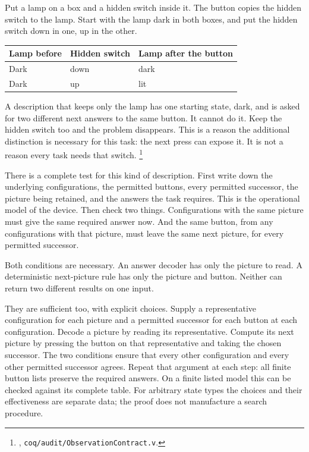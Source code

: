 \documentclass[11pt,twoside]{article}
\theoremstyle{thielethm}
\theoremstyle{thieledef}
\theoremstyle{thieledef}
\theoremstyle{thieledef}
\theoremstyle{thielethm}
\theoremstyle{thieleobs}
\theoremstyle{thielethm}
\begin{document}
Put a lamp on a box and a hidden switch inside it. The button copies the
hidden switch to the lamp. Start with the lamp dark in both boxes, and
put the hidden switch down in one, up in the other.

\begin{center}
\begin{tabular}{@{}lll@{}}
Lamp before & Hidden switch & Lamp after the button \\ \hline
Dark & down & dark \\
Dark & up & lit \\ \hline
\end{tabular}
\end{center}

A description that keeps only the lamp has one starting state, dark,
and is asked for two different next answers to the same button. It cannot
do it. Keep the hidden switch too and the problem disappears. This is a
reason the additional distinction is necessary for this task: the next
press can expose it. It is not a reason every task needs that switch.
\footnote{,
\texttt{coq/audit/ObservationContract.v}.}

There is a complete test for this kind of description. First write down
the underlying configurations, the permitted buttons, every permitted
successor, the picture being retained, and the answers the task requires.
This is the operational model of the device. Then check two things.
Configurations with the same picture must give the same required answer
now. And the same button, from any configurations with that picture, must
leave the same next picture, for every permitted successor.

Both conditions are necessary. An answer decoder has only the picture to
read. A deterministic next-picture rule has only the picture and button.
Neither can return two different results on one input.

They are sufficient too, with explicit choices. Supply a representative
configuration for each picture and a permitted successor for each button
at each configuration. Decode a picture by reading its representative.
Compute its next picture by pressing the button on that representative
and taking the chosen successor. The two conditions ensure that every
other configuration and every other permitted successor agrees. Repeat
that argument at each step: all finite button lists preserve the required
answers. On a finite listed model this can be checked against its complete
table. For arbitrary state types the choices and their effectiveness are
separate data; the proof does not manufacture a search procedure.
\end{document}
